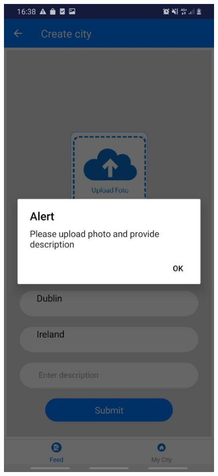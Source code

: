 \begin{figure}[h!]
\begin{minipage}[t]{0.48\textwidth}
\includegraphics[width=\linewidth,keepaspectratio=true]{img/alert.jpg}

\end{minipage}
\end{figure}
